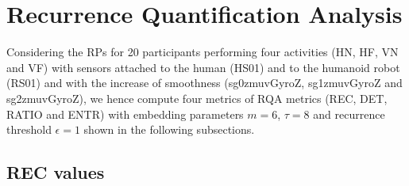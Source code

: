 \section{Recurrence Quantification Analysis}
Considering the RPs for 20 participants performing four activities 
(HN, HF, VN and VF) with sensors attached to the human (HS01) and to the 
humanoid robot (RS01) and with the increase of smoothness 
(sg0zmuvGyroZ, sg1zmuvGyroZ and sg2zmuvGyroZ), 
we hence compute four metrics of RQA metrics (REC, DET, RATIO and ENTR) with 
embedding parameters $m=6$, $\tau=8$ and recurrence threshold $\epsilon=1$ 
shown in the following subsections.

\newpage
\subsection{REC values}
%
%



